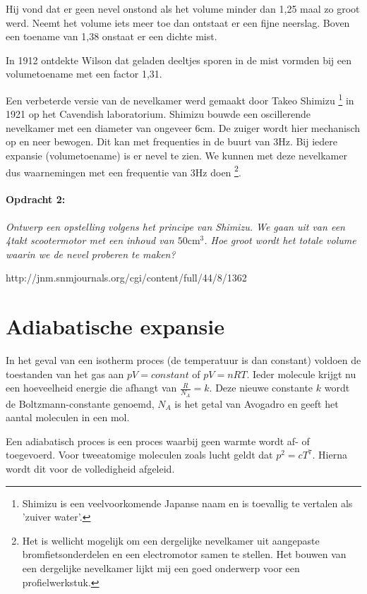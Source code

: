 Hij vond dat er geen nevel onstond als het volume minder dan 1,25
maal zo groot werd. Neemt het volume iets meer toe dan ontstaat er
een fijne neerslag. Boven een toename van 1,38 onstaat er een dichte
mist.

In 1912 ontdekte Wilson dat geladen deeltjes sporen in de mist vormden
bij een volumetoename met een factor 1,31.

Een verbeterde versie van de nevelkamer werd gemaakt door Takeo Shimizu
\footnote{Shimizu is een veelvoorkomende Japanse naam en is toevallig te
vertalen als 'zuiver water'.} in 1921 op het Cavendish laboratorium.
Shimizu bouwde een oscillerende nevelkamer met een diameter van ongeveer
6cm. De zuiger wordt hier mechanisch op en neer bewogen. Dit kan met
frequenties in de buurt van 3Hz. Bij iedere expansie (volumetoename) is
er nevel te zien. We kunnen met deze nevelkamer dus waarnemingen met een
frequentie van 3Hz doen \footnote{Het is wellicht mogelijk om een
dergelijke nevelkamer uit aangepaste bromfietsonderdelen en een
electromotor samen te stellen. Het bouwen van een dergelijke nevelkamer
lijkt mij een goed onderwerp voor een profielwerkstuk.}.


\paragraph*{Opdracht 2:}

\emph{Ontwerp een opstelling volgens het principe van Shimizu. We
gaan uit van een 4takt scootermotor met een inhoud van $50\mathrm{cm^{3}}$.
Hoe groot wordt het totale volume waarin we de nevel proberen te maken? }

http://jnm.snmjournals.org/cgi/content/full/44/8/1362


\section{Adiabatische expansie}

In het geval van een isotherm proces (de temperatuur is dan constant)
voldoen de toestanden van het gas aan $pV=constant$ of $pV=nRT$.
Ieder molecule krijgt nu een hoeveelheid energie die afhangt van $\frac{R}{N_{A}}=k$.
Deze nieuwe constante $k$ wordt de Boltzmann-constante genoemd, $N_{A}$
is het getal van Avogadro en geeft het aantal moleculen in een mol.

Een adiabatisch proces is een proces waarbij geen warmte wordt af-
of toegevoerd. Voor tweeatomige moleculen zoals lucht geldt dat $p^{2}=cT^{7}$.
Hierna wordt dit voor de volledigheid afgeleid. 

